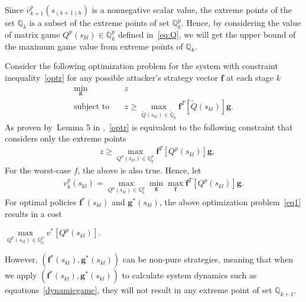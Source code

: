 \begin{pf}
Since $\bar{v}_{k+1}^{p}(s_{(k+1)h})$ is a nonnegative scalar value, the extreme points of the set $\mathbb{Q}_{k}$ is a subset of the extreme points  of set $\mathbb{Q}^p_k$. Hence, by considering the value of matrix game $Q^{p} (s_{kl})\in \mathbb{Q}^p_k$ defined in~\eqref{eq:Q}, we will get the upper bound of the maximum game value from extreme points of $\mathbb{Q}_k$. 

Consider the following optimization problem for the system with constraint inequality~\eqref{optr} for any possible attacker's strategy vector $\mathbf{f}$ at each stage $k$
\begin{align}
\min_{\mathbf{g}} \quad & z\label{ob_z}\\
\text{subject to}\quad &z \geq \max_{\tilde{Q}(s_{kl})\in \tilde{\mathbb{Q}}_{k}}\mathbf{f}^{T} [\tilde{Q}(s_{kl})]\mathbf{g}.
\label{optr}
\end{align}
As proven by~Lemma 5 in \cite{RGT},~\eqref{optr} is equivalent to the following constraint that considers only the extreme points
\begin{align}
\quad z \geq \max_{Q^{p}(s_{kl})\in \mathbb{Q}_{k}^p}\mathbf{f}^{T} [Q^{p}(s_{kl})]\mathbf{g},
\end{align}
For the worst-case $f$, the above is also true. Hence, let 
\begin{align}
\label{eq1}
v^p_{k}(s_{kl})
=\max_{Q^{p}(s_{kl})\in \mathbb{Q}_k^p} \min\limits_{\mathbf{g}}\max\limits_{\mathbf{f}}\mathbf{f}^T[Q^{p}(s_{kl})]\mathbf{g}.
\end{align}
For optimal policies $\mathbf{f}^{*}(s_{kl})$ and $\mathbf{g}^{*} (s_{kl})$, the above optimization problem~\eqref{eq1} results in a cost
\\\centerline{$
 \max\limits_{Q^{p}(s_{kl})\in \mathbb{Q}_{k}^p}v^*[Q^{p}(s_{kl})].
$}
However, $(\mathbf{f}^{*}(s_{kl}),\mathbf{g}^{*}(s_{kl}))$ can be non-pure strategies, meaning that when we apply  $(\mathbf{f}^{*}(s_{kl}),\mathbf{g}^{*}(s_{kl}))$  to calculate system dynamics such as equations~\eqref{dynamicgame}, they will not result in any extreme point of set $\mathbb{Q}_{k+1}$. 


\end{pf}
